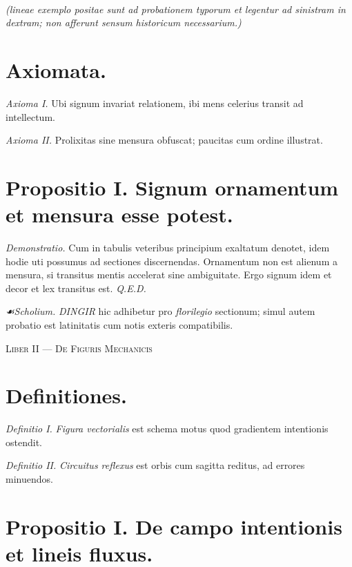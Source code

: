 \documentclass[12pt]{article}
\newcommand{\dingir}{\centerline{\Large \ornament{𒀭}}}
\newcommand{\scholia}{\textit{☙\;}}
\newcommand{\divider}{\vspace{1em}\dingir\vspace{1em}}
\newcommand{\Liber}[1]{\vspace{1ex}\begin{center}\Large\textsc{Liber #1}\end{center}\vspace{-0.5ex}\dingir\vspace{0.5ex}}
\begin{document}
\noindent {}\\
\textit{(lineae exemplo positae sunt ad probationem typorum et legentur ad sinistram in dextram; non afferunt sensum historicum necessarium.)}

\section*{Axiomata.}

\textit{Axioma I.} \; Ubi signum invariat relationem, ibi mens celerius transit ad intellectum.

\textit{Axioma II.} \; Prolixitas sine mensura obfuscat; paucitas cum ordine illustrat.

\section*{Propositio I. \; Signum  ornamentum et mensura esse potest.}

\textit{Demonstratio.} Cum  in tabulis veteribus principium exaltatum denotet, idem hodie uti possumus ad sectiones discernendas. Ornamentum non est alienum a mensura, si transitus mentis accelerat sine ambiguitate. Ergo signum idem et decor et lex transitus est. \textit{Q.E.D.}

\textit{\scholia Scholium.} \textit{DINGIR} hic adhibetur pro \textit{florilegio} sectionum; simul autem probatio est latinitatis cum notis exteris compatibilis.

\divider

\Liber{II — De Figuris Mechanicis}

\section*{Definitiones.}

\textit{Definitio I.} \; \textit{Figura vectorialis} est schema motus quod gradientem intentionis ostendit.

\textit{Definitio II.} \; \textit{Circuitus reflexus} est orbis cum sagitta reditus, ad errores minuendos.

\section*{Propositio I. \; De campo intentionis et lineis fluxus.}
\end{document}
